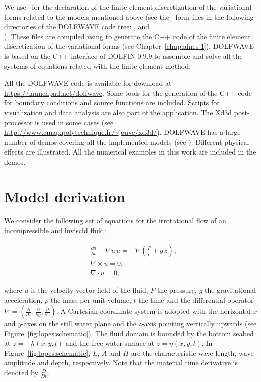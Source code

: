 We use \ufl\ for the declaration of the finite element discretization
of the variational forms related to the models mentioned above (see
the \ufl\ form files in the following directories of the DOLFWAVE code
tree: ,  and\\
).  These files are compiled using \ffc to
generate the C++ code of the finite element discretization of the
variational forms (see Chapter~\ref{chap:alnes-1}).  DOLFWAVE is based
on the C++ interface of DOLFIN $0.9.9$ to assemble and solve all the
systems of equations related with the finite element method.

All the DOLFWAVE code is available for download at
\url{https://launchpad.net/dolfwave}. Some tools for the generation of
the C++ code for boundary conditions and source functions are
included. Scripts for visualization and data analysis are also part of
the application. The Xd3d post-processor is used in some cases (see
\url{http://www.cmap.polytechnique.fr/~jouve/xd3d/}).  DOLFWAVE has a
large number of demos covering all the implemented models (see
). Different physical effects are illustrated.  All
the numerical examples in this work are included in the demos.

\section{Model derivation}
\label{sec:lopes:modelderivation}

We consider the following set of equations for the irrotational flow
of an incompressible and inviscid fluid:

\begin{subequations}\label{eq:lopes:euler}
\begin{align}
&\displaystyle\frac{\partial u}{\partial t}+\nabla u \,
  u=-\nabla\left(\frac{P}{\rho} +g\,
  z\right),\label{eq:lopes:euler-a} \\ &\nabla\times
  u={0},\label{eq:lopes:euler-b}
  \\ &\nabla\cdot{u}=0,\label{eq:lopes:euler-c}
\end{align}
\end{subequations}

where $u$ is the velocity vector field of the fluid, $P$ the pressure,
$g$ the gravitational acceleration, $\rho$ the mass per unit volume,
$t$ the time and the differential operator
$\nabla=\left(\frac{\partial }{\partial x},\frac{\partial }{\partial
y},\frac{\partial }{\partial z}\right).$ A Cartesian coordinate system
is adopted with the horizontal $x$ and $y$-axes on the still water
plane and the $z$-axis pointing vertically upwards (see
Figure~\ref{fig:lopes:schematic}).  The fluid domain is bounded by the
bottom seabed at $z=-h(x,y,t)$ and the free water surface at
$z=\eta(x,y,t)$.  In Figure~\ref{fig:lopes:schematic}, $L$, $A$ and
$H$ are the characteristic wave length, wave amplitude and depth,
respectively. Note that the material time derivative is denoted by
$\frac{D}{D t}$.

